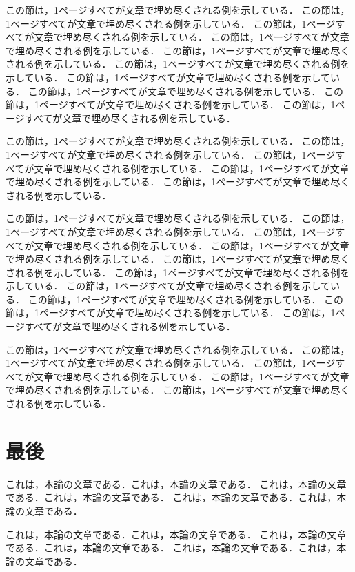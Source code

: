 この節は，1ページすべてが文章で埋め尽くされる例を示している．
この節は，1ページすべてが文章で埋め尽くされる例を示している．
この節は，1ページすべてが文章で埋め尽くされる例を示している．
この節は，1ページすべてが文章で埋め尽くされる例を示している．
この節は，1ページすべてが文章で埋め尽くされる例を示している．
この節は，1ページすべてが文章で埋め尽くされる例を示している．
この節は，1ページすべてが文章で埋め尽くされる例を示している．
この節は，1ページすべてが文章で埋め尽くされる例を示している．
この節は，1ページすべてが文章で埋め尽くされる例を示している．
この節は，1ページすべてが文章で埋め尽くされる例を示している．

この節は，1ページすべてが文章で埋め尽くされる例を示している．
この節は，1ページすべてが文章で埋め尽くされる例を示している．
この節は，1ページすべてが文章で埋め尽くされる例を示している．
この節は，1ページすべてが文章で埋め尽くされる例を示している．
この節は，1ページすべてが文章で埋め尽くされる例を示している．

この節は，1ページすべてが文章で埋め尽くされる例を示している．
この節は，1ページすべてが文章で埋め尽くされる例を示している．
この節は，1ページすべてが文章で埋め尽くされる例を示している．
この節は，1ページすべてが文章で埋め尽くされる例を示している．
この節は，1ページすべてが文章で埋め尽くされる例を示している．
この節は，1ページすべてが文章で埋め尽くされる例を示している．
この節は，1ページすべてが文章で埋め尽くされる例を示している．
この節は，1ページすべてが文章で埋め尽くされる例を示している．
この節は，1ページすべてが文章で埋め尽くされる例を示している．
この節は，1ページすべてが文章で埋め尽くされる例を示している．

この節は，1ページすべてが文章で埋め尽くされる例を示している．
この節は，1ページすべてが文章で埋め尽くされる例を示している．
この節は，1ページすべてが文章で埋め尽くされる例を示している．
この節は，1ページすべてが文章で埋め尽くされる例を示している．
この節は，1ページすべてが文章で埋め尽くされる例を示している．


\section{最後}

これは，本論の文章である．これは，本論の文章である．
これは，本論の文章である．これは，本論の文章である．
これは，本論の文章である．これは，本論の文章である．

これは，本論の文章である．これは，本論の文章である．
これは，本論の文章である．これは，本論の文章である．
これは，本論の文章である．これは，本論の文章である．

